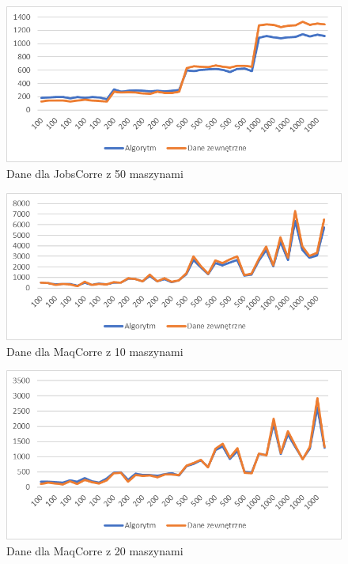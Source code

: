 \begin{figure}[h]
    \centering
    \includegraphics[scale=0.3]{jobs_50.png}
    \caption{Dane dla JobsCorre z 50 maszynami}
    \label{jobs_50}
\end{figure}


\begin{figure}[h]
    \centering
    \includegraphics[scale=0.3]{moq_10.png}
    \caption{Dane dla MaqCorre z 10 maszynami}
    \label{moq_10}
\end{figure}

\begin{figure}[h]
    \centering
    \includegraphics[scale=0.3]{moq_20.png}
    \caption{Dane dla MaqCorre z 20 maszynami}
    \label{moq_20}
\end{figure}

